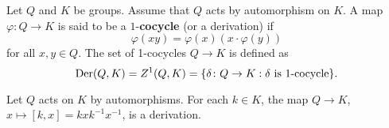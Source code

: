 %
%
%
%
%	
%	
%


Let $Q$ and $K$ be groups. Assume that $Q$ acts by automorphism on $K$.
A map $\varphi\colon Q\to K$ is said to be a $1$-\textbf{cocycle} (or a derivation) if
\[
		\varphi(xy)=\varphi(x)(x\cdot\varphi(y))
\]
for all $x,y\in Q$.  The set of 1-cocycles $Q\to K$ is defined as 
\[
\operatorname{Der}(Q,K)=Z^1(Q,K)=\{\delta\colon Q\to K:\text{$\delta$ is $1$-cocycle}\}.
\]

\begin{example}
	Let $Q$ acts on $K$ by automorphisms. For each $k\in K$, the map 
	$Q\to K$, $x\mapsto [k,x]=kxk^{-1}x^{-1}$, is a derivation. 
\end{example}

